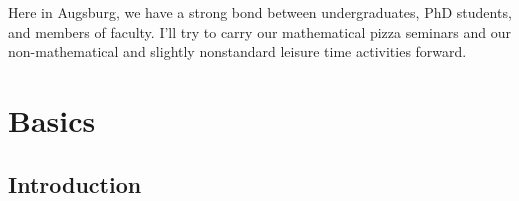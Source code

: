 \documentclass[10pt,reqno,a4paper]{amsbook}
\theoremstyle{definition}
\theoremstyle{plain}
\theoremstyle{remark}
\newcommand{\?}{\,{:}\,}
\renewcommand{\_}{\mathpunct{.}\,}
\begin{document}
{Here in Augsburg, we have a strong bond between undergraduates, PhD students,
and members of faculty. I'll try to carry our mathematical pizza seminars and
our non-mathematical and slightly nonstandard leisure time activities forward.


}


\setcounter{tocdepth}{1}
\tableofcontents


\chapter{Basics}

\section{Introduction}
\end{document}
